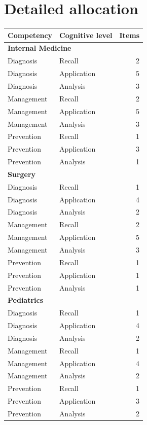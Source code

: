 \documentclass[11pt,a4paper]{article}
\begin{document}
\section*{Detailed allocation}
\begin{longtable}{llr}
\toprule
\textbf{Competency} & \textbf{Cognitive level} & \textbf{Items} \\
\midrule
\endhead
\multicolumn{3}{l}{\textbf{Internal Medicine}} \\
\quad Diagnosis & Recall & 2 \\
\quad Diagnosis & Application & 5 \\
\quad Diagnosis & Analysis & 3 \\
\quad Management & Recall & 2 \\
\quad Management & Application & 5 \\
\quad Management & Analysis & 3 \\
\quad Prevention & Recall & 1 \\
\quad Prevention & Application & 3 \\
\quad Prevention & Analysis & 1 \\
\multicolumn{3}{l}{\textbf{Surgery}} \\
\quad Diagnosis & Recall & 1 \\
\quad Diagnosis & Application & 4 \\
\quad Diagnosis & Analysis & 2 \\
\quad Management & Recall & 2 \\
\quad Management & Application & 5 \\
\quad Management & Analysis & 3 \\
\quad Prevention & Recall & 1 \\
\quad Prevention & Application & 1 \\
\quad Prevention & Analysis & 1 \\
\multicolumn{3}{l}{\textbf{Pediatrics}} \\
\quad Diagnosis & Recall & 1 \\
\quad Diagnosis & Application & 4 \\
\quad Diagnosis & Analysis & 2 \\
\quad Management & Recall & 1 \\
\quad Management & Application & 4 \\
\quad Management & Analysis & 2 \\
\quad Prevention & Recall & 1 \\
\quad Prevention & Application & 3 \\
\quad Prevention & Analysis & 2 \\

\end{longtable}
\end{document}
